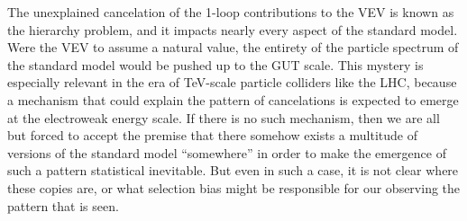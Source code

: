 The unexplained cancelation of the 1-loop contributions to the VEV is known as the hierarchy problem, and it impacts nearly every aspect of the standard model. Were the VEV to assume a natural value, the entirety of the particle spectrum of the standard model would be pushed up to the GUT scale. This mystery is especially relevant in the era of TeV-scale particle colliders like the LHC, because a mechanism that could explain the pattern of cancelations is expected to emerge at the electroweak energy scale.  If there is no such mechanism, then we are all but forced to accept the premise that there somehow exists a multitude of versions of the standard model ``somewhere'' in order to make the emergence of such a pattern statistical inevitable. But even in such a case, it is not clear where these copies are, or what selection bias might be responsible for our observing the pattern that is seen. 
